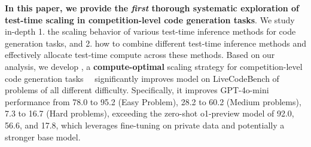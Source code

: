 \textbf{In this paper, we provide the \emph{first} thorough systematic exploration of test-time scaling in competition-level code generation tasks}. We study in-depth 1. the scaling behavior of various test-time inference methods for code generation tasks, and 2. how to combine different test-time inference methods and effectively allocate test-time compute across these methods. Based on our analysis, we develop \frameworkname, a \textbf{compute-optimal} scaling strategy for competition-level code generation tasks%
~\frameworkname~significantly improves model on LiveCodeBench of problems of all different difficulty. Specifically, it improves GPT-4o-mini performance from 78.0 to 95.2 (Easy Problem), 28.2 to 60.2 (Medium problems),  7.3 to 16.7 (Hard problems), exceeding the zero-shot o1-preview model of 92.0, 56.6, and 17.8,  which leverages fine-tuning on private data and potentially a stronger base model.  